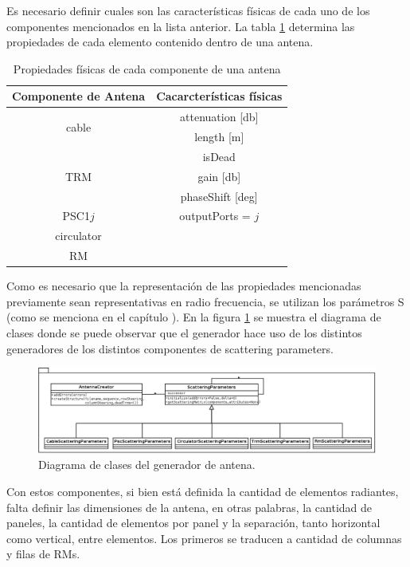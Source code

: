 Es necesario definir cuales son las características físicas de cada uno de los componentes mencionados en la lista anterior. 
La tabla \ref{tab:propertiesOfComponents} determina las propiedades de cada elemento contenido dentro de una antena. 

\begin{table}[H]
  \footnotesize
  \centering
  \begin{tabular}{|c|c|}
	\hline
	\textbf{Componente de Antena} & \textbf{Cacarcterísticas físicas} \tabularnewline \hline 
	\multirow{2}{*}{cable} &  attenuation [db] \tabularnewline \cline{2-2}
	 & length [m] \tabularnewline \hline 
	\multirow{3}{*}{TRM} & isDead \tabularnewline \cline{2-2}
	 & gain [db]\tabularnewline \cline{2-2}
	 & phaseShift [deg] \tabularnewline \hline 
	PSC1$j$ & outputPorts = $j$ \tabularnewline \hline 
	circulator & \tabularnewline \hline 
	RM & \tabularnewline \hline 
  \end{tabular}
  \caption{Propiedades físicas de cada componente de una antena}
  \label{tab:propertiesOfComponents}
\end{table}

Como es necesario que la representación de las propiedades mencionadas previamente sean representativas en radio frecuencia,
se utilizan los parámetros S (como se menciona en el capítulo ). En la figura 
\ref{fig:creationPackage} se muestra el diagrama de clases donde se puede observar que el generador hace uso de los distintos 
generadores de los distintos componentes de scattering parameters.

\begin{figure}
 \centering
 \includegraphics[width=15cm]{gfx/creationPackage.png}
 \caption{Diagrama de clases del generador de antena.}
 \label{fig:creationPackage}
\end{figure}

Con estos componentes, si bien está definida la cantidad de elementos radiantes, falta definir las dimensiones de la antena, 
en otras palabras, la cantidad de paneles, la cantidad de elementos por panel y la separación, tanto horizontal como vertical,
entre elementos. Los primeros se traducen a cantidad de columnas y filas de RMs. 

